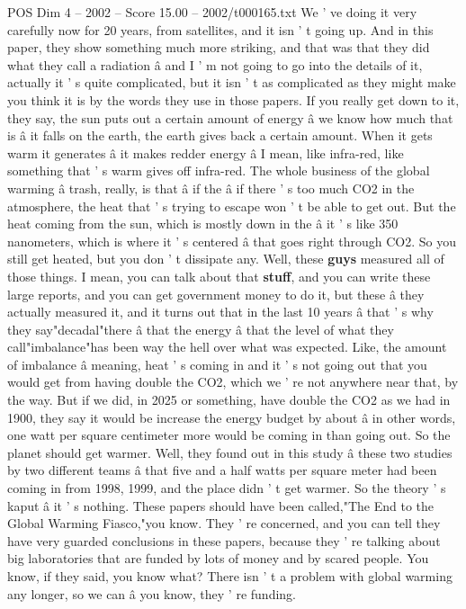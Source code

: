 \begin{textsample}{POS Dim 4 – 2002 – Score 15.00 – 2002/t000165.txt}
We ' ve doing it very carefully now for 20 years, from satellites, and it isn ' t going up.
And in this paper, they show something much more striking, and that was that they did what they call a radiation â and I ' m not going to go into the details of it, actually it ' s quite complicated, but it isn ' t as complicated as they might make you think it is by the words they use in those papers.
If you really get down to it, they say, the sun puts out a certain amount of energy â we know how much that is â it falls on the earth, the earth gives back a certain amount.
When it gets warm it generates â it makes redder energy â I mean, like infra-red, like something that ' s warm gives off infra-red.
The whole business of the global warming â trash, really, is that â if the â if there ' s too much CO2 in the atmosphere, the heat that ' s trying to escape won ' t be able to get out.
But the heat coming from the sun, which is mostly down in the â it ' s like 350 nanometers, which is where it ' s centered â that goes right through CO2.
So you still get heated, but you don ' t dissipate any.
Well, these \textbf{guys} measured all of those things.
I mean, you can talk about that \textbf{stuff}, and you can write these large reports, and you can get government money to do it, but these â they actually measured it, and it turns out that in the last 10 years â that ' s why they say"decadal"there â that the energy â that the level of what they call"imbalance"has been way the hell over what was expected.
Like, the amount of imbalance â meaning, heat ' s coming in and it ' s not going out that you would get from having double the CO2, which we ' re not anywhere near that, by the way.
But if we did, in 2025 or something, have double the CO2 as we had in 1900, they say it would be increase the energy budget by about â in other words, one watt per square centimeter more would be coming in than going out.
So the planet should get warmer.
Well, they found out in this study â these two studies by two different teams â that five and a half watts per square meter had been coming in from 1998, 1999, and the place didn ' t get warmer.
So the theory ' s kaput â it ' s nothing.
These papers should have been called,"The End to the Global Warming Fiasco,"you know.
They ' re concerned, and you can tell they have very guarded conclusions in these papers, because they ' re talking about big laboratories that are funded by lots of money and by scared people.
You know, if they said, you know what?
There isn ' t a problem with global warming any longer, so we can â you know, they ' re funding.

\end{textsample}
